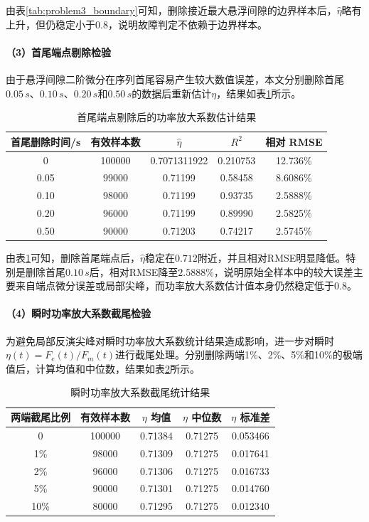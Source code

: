 \documentclass[a4paper]{nmmcm}
\begin{document}
由表\ref{tab:problem3_boundary}可知，删除接近最大悬浮间隙的边界样本后，$\hat{\eta}$略有上升，但仍稳定小于$0.8$，说明故障判定不依赖于边界样本。

\paragraph{（3）首尾端点剔除检验}

由于悬浮间隙二阶微分在序列首尾容易产生较大数值误差，本文分别删除首尾$0.05\,s$、$0.10\,s$、$0.20\,s$和$0.50\,s$的数据后重新估计$\eta$，结果如表\ref{tab:problem3_endpoint}所示。

\FloatBarrier
\begin{table}[H]
\centering
\caption{首尾端点剔除后的功率放大系数估计结果}
\label{tab:problem3_endpoint}
\begin{tabular}{c c c c c}
\hline
首尾删除时间/s & 有效样本数 & $\hat{\eta}$ & $R^2$ & 相对 RMSE \\
\hline
0 & 100000 & 0.7071311922 & 0.210753 & 12.736\% \\
0.05 & 99000 & 0.71199 & 0.58458 & 8.6086\% \\
0.10 & 98000 & 0.71199 & 0.93735 & 2.5888\% \\
0.20 & 96000 & 0.71199 & 0.89990 & 2.5825\% \\
0.50 & 90000 & 0.71203 & 0.74217 & 2.5745\% \\
\hline
\end{tabular}
\end{table}
\FloatBarrier

由表\ref{tab:problem3_endpoint}可知，删除首尾端点后，$\hat{\eta}$稳定在$0.712$附近，并且相对RMSE明显降低。特别是删除首尾$0.10\,s$后，相对RMSE降至$2.5888\%$，说明原始全样本中的较大误差主要来自端点微分误差或局部尖峰，而功率放大系数估计值本身仍然稳定低于$0.8$。

\paragraph{（4）瞬时功率放大系数截尾检验}

为避免局部反演尖峰对瞬时功率放大系数统计结果造成影响，进一步对瞬时$\eta(t)=F_e(t)/F_m(t)$进行截尾处理。分别删除两端1\%、2\%、5\%和10\%的极端值后，计算均值和中位数，结果如表\ref{tab:problem3_trim}所示。

\FloatBarrier
\begin{table}[H]
\centering
\caption{瞬时功率放大系数截尾统计结果}
\label{tab:problem3_trim}
\begin{tabular}{c c c c c}
\hline
两端截尾比例 & 有效样本数 & $\eta$ 均值 & $\eta$ 中位数 & $\eta$ 标准差 \\
\hline
0 & 100000 & 0.71384 & 0.71275 & 0.053466 \\
1\% & 98000 & 0.71309 & 0.71275 & 0.017641 \\
2\% & 96000 & 0.71306 & 0.71275 & 0.016733 \\
5\% & 90000 & 0.71301 & 0.71275 & 0.014760 \\
10\% & 80000 & 0.71295 & 0.71275 & 0.012340 \\
\hline
\end{tabular}
\end{table}
\FloatBarrier
\end{document}
